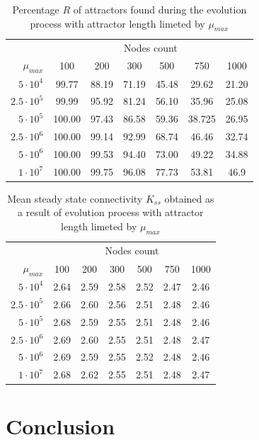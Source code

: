 \documentclass[procedia]{easychair}
\begin{document}
	\begin{table}[ht!]
		\begin{tabular}{r | c c c c c c}
			& \multicolumn{6}{c}{Nodes count} \\
			$\mu_{max}$	& 100	& 	200	&	300	&	500	&	750	&	1000\\ \hline
			$5 \cdot 10^4$	&	99.77	&	88.19	&	71.19	&	45.48	&	29.62	&	21.20\\
			$2.5 \cdot 10^5$	&	99.99	&	95.92	&	81.24	&	56.10	&	35.96	&	25.08\\
			$5 \cdot 10^5$	&	100.00	&	97.43	&	86.58	&	59.36	&	38.725	&	26.95\\
			$2.5 \cdot 10^6$	&	100.00	&	99.14	&	92.99	&	68.74	&	46.46	&	32.74\\
			$5 \cdot 10^6$	&	100.00	&	99.53	&	94.40	&	73.00	&	49.22	&	34.88\\
			$1 \cdot 10^7$	&	100.00	&	99.75	&	96.08	&	77.73	&	53.81	&	46.9
		\end{tabular}
		\caption{Percentage $R$ of attractors found during the evolution process with attractor length limeted by $\mu_{max}$}
	\end{table}
	\begin{table}[ht!]
		\begin{tabular}{r | c c c c c c}
			& \multicolumn{6}{c}{Nodes count} \\
			$\mu_{max}$	& 100	& 	200	&	300	&	500	& 750	&	1000\\
			\hline
			$5 \cdot 10^4$	&	2.64	&	2.59	&	2.58	&	2.52	&	2.47	&	2.46\\
			$2.5 \cdot 10^5$	&	2.66	&	2.60	&	2.56	&	2.51	&	2.48	&	2.46\\
			$5 \cdot 10^5$	&	2.68	&	2.59	&	2.55	&	2.51	&	2.48	&	2.46\\
			$2.5 \cdot 10^6$	&	2.69	&	2.60	&	2.55	&	2.51	&	2.48	&	2.47\\
			$5 \cdot 10^6$	&	2.69	&	2.59	&	2.55	&	2.52	&	2.48	&	2.46\\
			$1 \cdot 10^7$	&	2.68	&	2.62	&	2.55	&	2.51	&	2.48	&	2.47\\
		\end{tabular}
		\caption{Mean steady state connectivity $K_{ss}$ obtained as a result of evolution process with attractor length limeted by $\mu_{max}$}
	\end{table}
	
	\clearpage
	\section{Conclusion}
	\label{sect:conclusion}
	
	\label{sect:bib}
	
	
\end{document}
